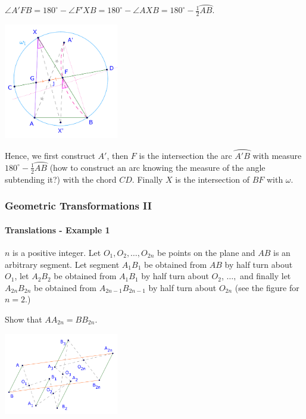 \documentclass[8pt,xcolor=table,dvipsnames]{beamer}
\providecommand{\half}{\frac{1}{2}}
\newcommand{\dg}{^\circ}
\newcommand{\arc}[1]{\wideparen{#1}}
\begin{document}
\begin{frame}[t]
\begin{overprint}
\begin{center}
        \end{center}
        $\angle A'FB = 180\dg - \angle F'XB = 180\dg - \angle AXB = 180\dg - \half \arc{AB}.$
        \begin{center}
            \includegraphics[width=5cm]{./svg/pdf/rotation-3e.pdf}
        \end{center}
        Hence, we first construct $A'$, then $F$ is the intersection the arc $\arc{A'B}$ with measure $180\dg - \half \arc{AB}$
        (how to construct an arc knowing the measure of the angle subtending it?) with the chord $CD.$
        Finally $X$ is the intersection of $BF$ with $\omega.$
    \end{overprint}
\end{frame}

\begin{frame}[t]
    \frametitle{Geometric Transformations II}
    \framesubtitle{Translations - Example 1}
    \begin{example}
        $n$ is a positive integer. Let $O_1, O_2, \ldots, O_{2n}$ be points on the plane and $AB$ is an arbitrary segment.
        Let segment $A_1B_1$ be obtained from $AB$ by half turn about $O_1$, let $A_2B_2$ be obtained from $A_1B_1$ by half turn about $O_2$, $\ldots,$
        and finally let $A_{2n}B_{2n}$ be obtained from $A_{2n-1}B_{2n-1}$ by half turn about $O_{2n}$ (see the figure for $n=2.$)

        \bigbreak
        Show that $AA_{2n} = BB_{2n}.$
    \end{example}

    \begin{center}
        \includegraphics[width=5cm]{./svg/pdf/translation-1.pdf}
    \end{center}
\end{frame}
\end{document}
